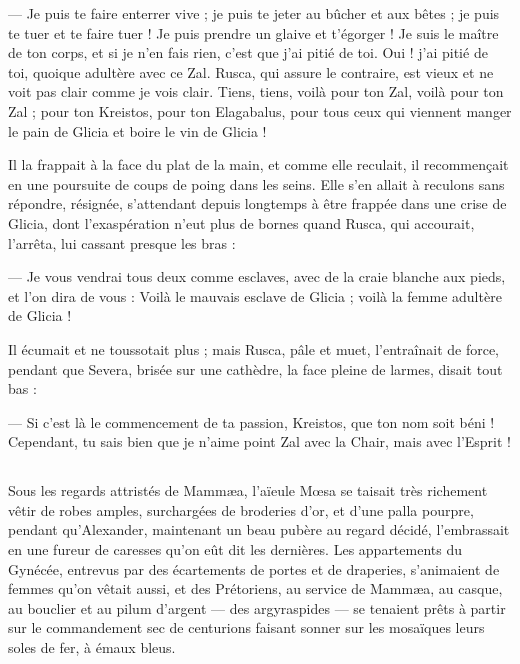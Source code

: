 \documentclass[a4paper, 11pt, oneside, polutonikogreek, french]{article}
\begin{document}
--- Je puis te faire enterrer vive ; je puis te jeter au bûcher et aux bêtes ; je puis te tuer et te faire tuer ! Je puis prendre un glaive et t'égorger ! Je suis le maître de ton corps, et si je n'en fais rien, c'est que j'ai pitié de toi. Oui ! j'ai pitié de toi, quoique adultère avec ce Zal. Rusca, qui assure le contraire, est vieux et ne voit pas clair comme je vois clair. Tiens, tiens, voilà pour ton Zal, voilà pour ton Zal ; pour ton Kreistos, pour ton Elagabalus, pour tous ceux qui viennent manger le pain de Glicia et boire le vin de Glicia !

Il la frappait à la face du plat de la main, et comme elle reculait, il recommençait en une poursuite de coups de poing dans les seins. Elle s'en allait à reculons sans répondre, résignée, s'attendant depuis longtemps à être frappée dans une crise de Glicia, dont l'exaspération n'eut plus de bornes quand Rusca, qui accourait, l'arrêta, lui cassant presque les bras :

--- Je vous vendrai tous deux comme esclaves, avec de la craie blanche aux pieds, et l'on dira de vous : Voilà le mauvais esclave de Glicia ; voilà la femme adultère de Glicia !

Il écumait et ne toussotait plus ; mais Rusca, pâle et muet, l'entraînait de force, pendant que Severa, brisée sur une cathèdre, la face pleine de larmes, disait tout bas :

--- Si c'est là le commencement de ta passion, Kreistos, que ton nom soit béni ! Cependant, tu sais bien que je n'aime point Zal avec la Chair, mais avec l'Esprit !
\clearpage
\subsection{}
\paragraph{}
Sous les regards attristés de Mammæa, l'aïeule Mœsa se taisait très richement vêtir de robes amples, surchargées de broderies d'or, et d'une palla pourpre, pendant qu'Alexander, maintenant un beau pubère au regard décidé, l'embrassait en une fureur de caresses qu'on eût dit les dernières. Les appartements du Gynécée, entrevus par des écartements de portes et de draperies, s'animaient de femmes qu'on vêtait aussi, et des Prétoriens, au service de Mammæa, au casque, au bouclier et au pilum d'argent --- des argyraspides --- se tenaient prêts à partir sur le commandement sec de centurions faisant sonner sur les mosaïques leurs soles de fer, à émaux bleus.
\end{document}
